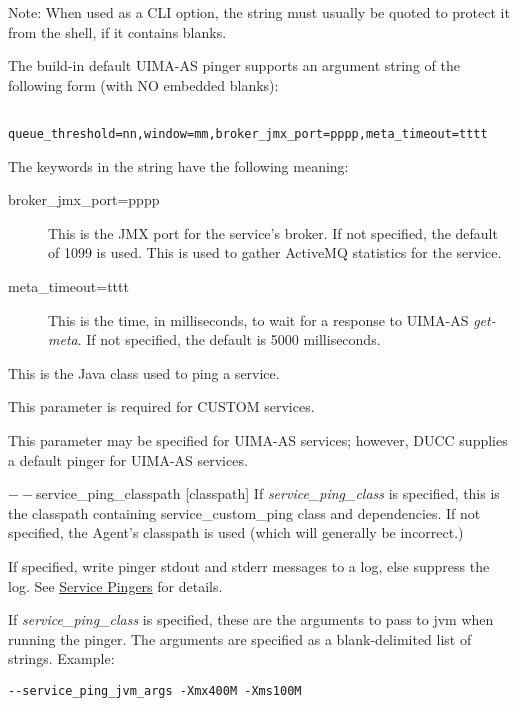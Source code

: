 \begin{description}
        Note: When used as a CLI option, the string must usually be
        quoted to protect it from the shell, if it contains blanks.

        The build-in default UIMA-AS pinger supports an argument string of the following form
        (with NO embedded blanks):
\begin{verbatim}
     queue_threshold=nn,window=mm,broker_jmx_port=pppp,meta_timeout=tttt
\end{verbatim}
        
        The keywords in the string have the following meaning:
        \begin{description}
          \item[broker\_jmx\_port=pppp] This is the JMX port for the service's broker.  If not
            specified, the default of 1099 is used.  This is used to gather ActiveMQ statistics
            for the service.
          \item[meta\_timeout=tttt] This is the time, in milliseconds, to wait for a response
            to UIMA-AS {\em get-meta}.  If not specified, the default is 5000 milliseconds.
        \end{description}
      
      \item[$--$service\_ping\_class {[classname]}] This is the Java class used to ping a service. 

        This parameter is required for CUSTOM services.

        This parameter may be specified for UIMA-AS services; however, DUCC supplies a default
        pinger for UIMA-AS services.

      \begin{sloppypar}  
      \item[$--$service\_ping\_classpath {[classpath]}] If {\em service\_ping\_class} is specified,
        this is the classpath containing service\_custom\_ping class and dependencies.  If not
        specified, the Agent's classpath is used (which will generally be incorrect.)
      \end{sloppypar}
      
      \item[$--$service\_ping\_dolog {[boolean]}] If specified, write pinger stdout and stderr
        messages to a log, else suppress the log. See \hyperref[sec:service.pingers]{Service Pingers}
        for details.

      \item[$--$service\_ping\_jvm\_args {[string]}] If 
        {\em service\_ping\_class} is specified, these are the arguments 
        to pass to jvm when running the pinger. The arguments are specified as a blank-delimited
        list of strings.  Example:
\begin{verbatim}
--service_ping_jvm_args -Xmx400M -Xms100M
\end{verbatim}
        

\end{description}
